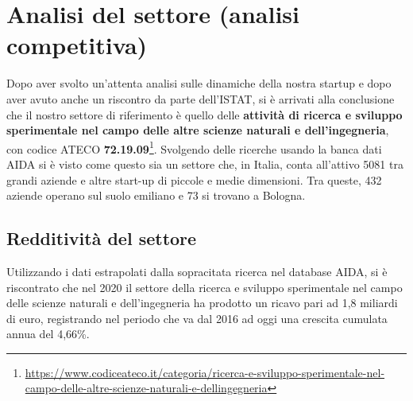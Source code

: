 

\renewcommand\tabularxcolumn[1]{m{#1}}

\newpage
\section{Analisi del settore (analisi competitiva)}

Dopo aver svolto un'attenta analisi sulle dinamiche della nostra startup e dopo aver avuto anche un riscontro da parte dell'ISTAT, si è arrivati alla conclusione che il nostro settore di riferimento è quello delle \textbf{attività di ricerca e sviluppo sperimentale nel campo delle altre scienze naturali e dell'ingegneria}, con codice ATECO \textbf{72.19.09}\footnote{\url{https://www.codiceateco.it/categoria/ricerca-e-sviluppo-sperimentale-nel-campo-delle-altre-scienze-naturali-e-dellingegneria}}. Svolgendo delle ricerche usando la banca dati AIDA si è visto come questo sia un settore che, in Italia, conta all'attivo 5081 tra grandi aziende e altre start-up di piccole e medie dimensioni. Tra queste, 432 aziende operano sul suolo emiliano e 73 si trovano a Bologna.

\subsection{Redditività del settore}

Utilizzando i dati estrapolati dalla sopracitata ricerca nel database AIDA, si è riscontrato che nel 2020 il settore della ricerca e sviluppo sperimentale nel campo delle scienze naturali e dell'ingegneria ha prodotto un ricavo pari ad 1,8 miliardi di euro, registrando nel periodo che va dal 2016 ad oggi una crescita cumulata annua del 4,66\%.

